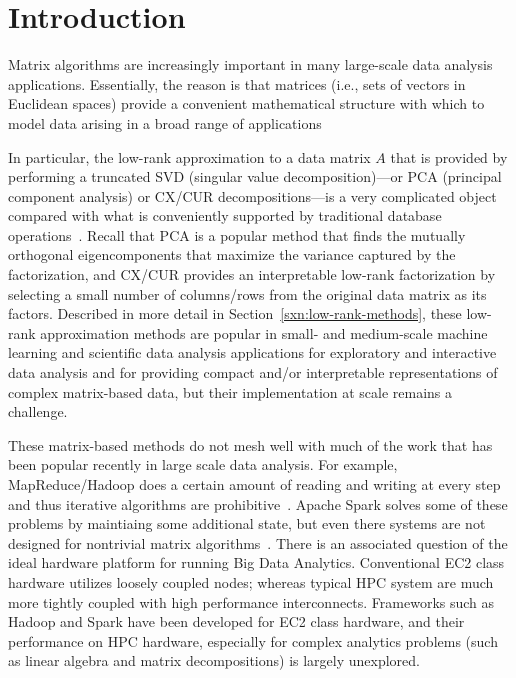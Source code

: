 \section{Introduction}
\label{sec:intro}

Matrix algorithms are increasingly important in many large-scale data analysis applications.
Essentially, the reason is that matrices (i.e., sets of vectors in Euclidean
spaces) provide a convenient mathematical structure with which to model data
arising in a broad range of applications

In particular, the low-rank approximation to a data matrix $A$ that is provided by performing a truncated SVD (singular value decomposition)---or PCA (principal component analysis) or CX/CUR decompositions---is a very complicated object compared with what is conveniently supported by traditional database operations~\cite{Skillicorn07}. Recall that PCA is a popular method that finds the mutually orthogonal eigencomponents that maximize the variance captured by the factorization, and CX/CUR provides an interpretable low-rank factorization by selecting a small number of columns/rows from the original data matrix as its factors.
Described in more detail in Section~\ref{sxn:low-rank-methods}, these low-rank approximation methods are popular in small- and medium-scale machine learning and scientific data analysis applications for exploratory and interactive data analysis and for providing compact and/or interpretable representations of complex matrix-based data, but their implementation at scale remains a challenge.

These matrix-based methods do not mesh well with much of the work that has been popular recently in large scale data analysis.
For example, MapReduce/Hadoop does a certain amount of reading and writing at every step and thus iterative algorithms are prohibitive~\cite{DG08_CACM}.
Apache Spark solves some of these problems by maintiaing some additional state, but even there systems are not designed for nontrivial matrix algorithms~\cite{SPARK_NSDI_12}. There is an associated question of the ideal hardware platform for running Big Data Analytics. Conventional EC2 class hardware utilizes loosely coupled nodes; whereas typical HPC system are much more tightly coupled with high performance interconnects. Frameworks such as Hadoop and Spark have been developed for EC2 class hardware, and their performance on HPC hardware, especially for complex analytics problems (such as linear algebra and matrix decompositions) is largely unexplored. 

